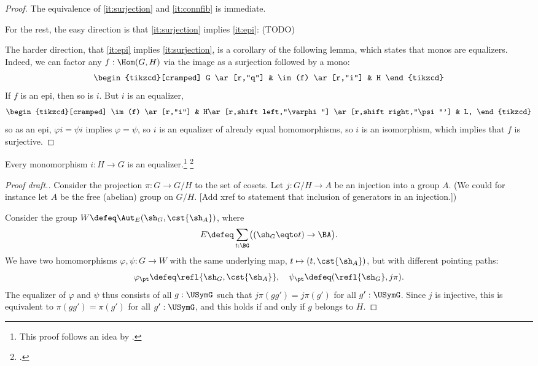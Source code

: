 \begin{proof}
  The equivalence of \ref{it:surjection} and \ref{it:connfib} is immediate.

  For the rest, the easy direction is that \ref{it:surjection} implies \ref{it:epi}:
  (TODO)

  The harder direction, that \ref{it:epi} implies \ref{it:surjection},
  is a corollary of the following lemma, which states that monos are equalizers.
  Indeed, we can factor any $f : \Hom(G,H)$ via the image as a surjection followed
  by a mono:
  \[
    \begin{tikzcd}[cramped]
      G \ar[r,"q"] & \im(f) \ar[r,"i"] & H
    \end{tikzcd}
  \]
  If $f$ is an epi, then so is $i$. But $i$ is an equalizer,
  \[
    \begin{tikzcd}[cramped]
      \im(f) \ar[r,"i"] & H\ar[r,shift left,"\varphi"]
      \ar[r,shift right,"\psi"'] & L,
    \end{tikzcd}
  \]
  so as an epi, $\varphi i = \psi i$ implies $\varphi = \psi$, so $i$
  is an equalizer of already equal homomorphisms, so $i$ is an isomorphism,
  which implies that $f$ is surjective.
\end{proof}

\begin{lemma}\label{lem:monos-are-equalizers}
  Every monomorphism $i : H \to G$ is an equalizer.\footnote{%
    This proof follows an idea by \citeauthor{TrimbleEpisSurjective}\footnotemark{}.}%
  \footcitetext{TrimbleEpisSurjective}
\end{lemma}
\begin{proof}[Proof draft.] Consider the projection $\pi : G \to G/H$ to the set of cosets.
  Let $j : G/H \to A$ be an injection into a group $A$.
  (We could for instance let $A$ be the free (abelian) group on $G/H$. [Add xref to statement that inclusion of generators in an injection.])

  Consider the group $W \defeq \Aut_E(\sh_G,\cst{\sh_A})$, where
  \[
    E \defeq \sum_{t : \BG}\bigl((\sh_G \eqto t) \to \BA\bigr).
  \]
  We have two homomorphisms $\varphi,\psi : G \to W$ with the same underlying map,
  $t \mapsto (t , \cst{\sh_A})$, but with different pointing paths:
  \[
    \varphi_\pt \defeq \refl{\sh_G,\cst{\sh_A}}, \quad
    \psi_\pt \defeq (\refl{\sh_G}, j\pi).
  \]
  The equalizer of $\varphi$ and $\psi$ thus consists of all $g:\USymG$
  such that $j\pi(gg') = j\pi(g')$ for all $g':\USymG$. Since $j$ is injective,
  this is equivalent to $\pi(gg')=\pi(g')$ for all $g':\USymG$, and this holds
  if and only if $g$ belongs to $H$.
\end{proof}

